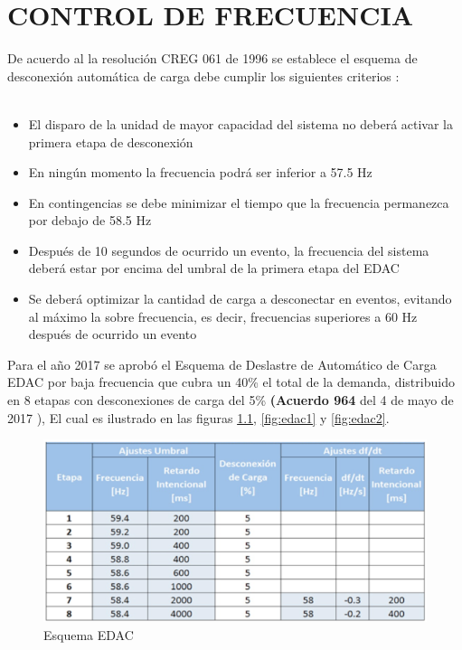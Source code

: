 \documentclass[a5paper]{book}%
\begin{document}
\chapter{CONTROL DE FRECUENCIA}

De acuerdo al la resolución CREG 061 de 1996 se establece el esquema de desconexión automática de carga debe cumplir los siguientes criterios \cite{CREG0611996}:\\\\

\begin{itemize}
\item El disparo de la unidad de mayor capacidad del sistema no deberá activar la primera etapa de
desconexión
\item En ningún momento la frecuencia podrá ser inferior a 57.5 Hz
\item En contingencias se debe minimizar el tiempo que la frecuencia permanezca por debajo de 58.5 Hz
\item Después de 10 segundos de ocurrido un evento, la frecuencia del sistema deberá estar por encima
del umbral de la primera etapa del EDAC
\item Se deberá optimizar la cantidad de carga a desconectar en eventos, evitando al máximo la sobre
frecuencia, es decir, frecuencias superiores a 60 Hz después de ocurrido un evento
\end{itemize}

Para el año 2017 se aprobó el Esquema de Deslastre de Automático de
Carga EDAC por baja frecuencia que cubra un 40\% el total de la
demanda, distribuido en 8 etapas con desconexiones de carga del 5\%
\textbf{(Acuerdo 964} del 4 de mayo de 2017 ), El cual es ilustrado en
las figuras \ref{fig:edac}, \ref{fig:edac1} y \ref{fig:edac2}.

\begin{figure}[H]
  \centering
  \caption{Esquema EDAC}
  \label{fig:edac}
  \includegraphics[width=0.8\linewidth]{esquema_edac}
\end{figure}
\end{document}

